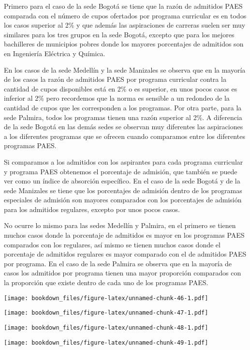 \documentclass[]{article}
\theoremstyle{definition}
\theoremstyle{definition}
\theoremstyle{definition}
\theoremstyle{remark}
\begin{document}
Primero para el caso de la sede Bogotá se tiene que la razón de
admitidos PAES comparada con el número de cupos ofertados por programa
curricular es en todos los casos superior al 2\% y que además las
aspiraciones de carreras suelen ser muy similares para los tres grupos
en la sede Bogotá, excepto que para los mejores bachilleres de
municipios pobres donde los mayores porcentajes de admitidos son en
Ingeniería Eléctrica y Química.

En los casos de la sede Medellín y la sede Manizales se observa que en
la mayoría de los casos la razón de admitidos PAES por programa
curricular contra la cantidad de cupos disponibles está en 2\% o es
superior, en unos pocos casos es inferior al 2\% pero recordemos que la
norma es sensible a un redondeo de la cantidad de cupos que les
corresponden a los programas. Por otra parte, para la sede Palmira,
todos los programas tienen una razón superior al 2\%. A diferencia de la
sede Bogotá en las demás sedes se observan muy diferentes las
aspiraciones a los diferentes programas que se ofrecen cuando comparamos
entre los diferentes programas PAES.

Si comparamos a los admitidos con los aspirantes para cada programa
curricular y programa PAES obtenemos el porcentaje de admisión, que
también se puede ver como un índice de absorción específico. En el caso
de la sede Bogotá y de la sede Manizales se tiene que los porcentajes de
admisión dentro de los programas especiales de admisión son mayores
comparados con los porcentajes de admisión para los admitidos regulares,
excepto por unos pocos casos.

No ocurre lo mismo para las sedes Medellín y Palmira, en el primero se
tienen muchos casos donde la porcentaje de admitidos es mayor en los
programas PAES comparados con los regulares, así mismo se tienen muchos
casos donde el porcentaje de admitidos regulares es mayor comparado con
el de admitidos PAES por programa. En el caso de la sede Palmira se
observa que en la mayoría de casos los admitidos por programa tienen una
mayor proporción comparados con la proporción que existe dentro de cada
uno de los programas PAES.

\texttt{[image: bookdown\_files/figure-latex/unnamed-chunk-46-1.pdf]}

\texttt{[image: bookdown\_files/figure-latex/unnamed-chunk-47-1.pdf]}

\texttt{[image: bookdown\_files/figure-latex/unnamed-chunk-48-1.pdf]}

\texttt{[image: bookdown\_files/figure-latex/unnamed-chunk-49-1.pdf]}
\end{document}
